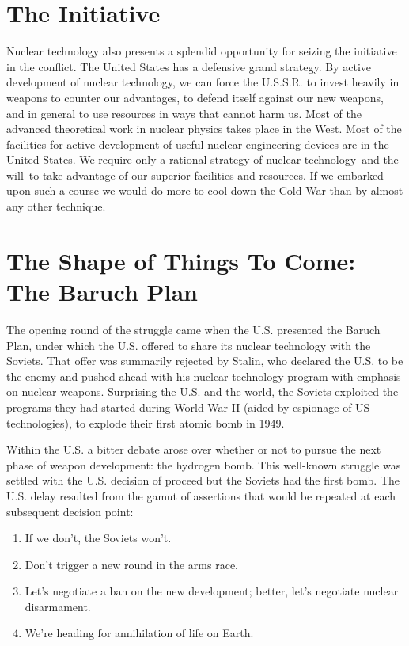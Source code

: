 \section{The Initiative}
Nuclear technology also presents a splendid opportunity for seizing the initiative in the conflict. The United States has a defensive grand strategy. By active development of nuclear technology, we can force the U.S.S.R. to invest heavily in weapons to counter our advantages, to defend itself against our new weapons, and in general to use resources in ways that cannot harm us. Most of the advanced theoretical work in nuclear physics takes place in the West. Most of the facilities for active development of useful nuclear engineering devices are in the United States. We require only a rational strategy of nuclear technology--and the will--to take advantage of our superior facilities and resources. If we embarked upon such a course we would do more to cool down the Cold War than by almost any other technique.

\section{The Shape of Things To Come: The Baruch Plan}
The opening round of the struggle came when the U.S. presented the Baruch Plan, under which the U.S. offered to share its nuclear technology with the Soviets. That offer was summarily rejected by Stalin, who declared the U.S. to be the enemy and pushed ahead with his nuclear technology program with emphasis on nuclear weapons. Surprising the U.S. and the world, the Soviets exploited the programs they had started during World War II (aided by espionage of US technologies), to explode their first atomic bomb in 1949.

Within the U.S. a bitter debate arose over whether or not to pursue the next phase of weapon development: the hydrogen bomb. This well-known struggle was settled with the U.S. decision of proceed but the Soviets had the first bomb. The U.S. delay resulted from the gamut of assertions that would be repeated at each subsequent decision point:
\begin{enumerate}
    \item If we don't, the Soviets won't.
    \item Don't trigger a new round in the arms race.
    \item Let's negotiate a ban on the new development; better, let's negotiate nuclear disarmament.
    \item We're heading for annihilation of life on Earth.
\end{enumerate}

